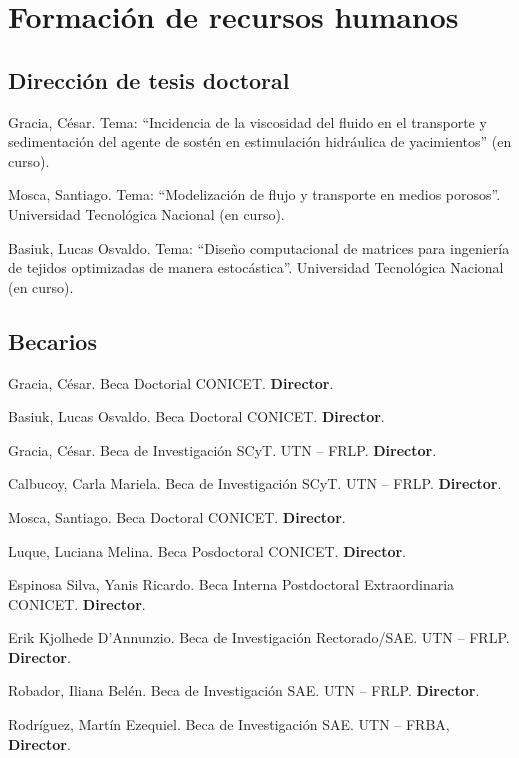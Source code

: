 \section{Formación de recursos humanos}

\subsection{Dirección de tesis doctoral}
 Gracia, César. Tema: ``Incidencia de la viscosidad del fluido en el transporte y sedimentación del agente de sostén en estimulación hidráulica de yacimientos'' (en curso).

 Mosca, Santiago. Tema: ``Modelización de flujo y transporte en medios porosos''. Universidad Tecnológica Nacional (en curso).

 Basiuk, Lucas Osvaldo. Tema: ``Diseño computacional de matrices para ingeniería de tejidos optimizadas de manera estocástica''. Universidad Tecnológica Nacional  (en curso).

\subsection{Becarios}

     Gracia, César. Beca Doctorial CONICET. \textbf{Director}.

     Basiuk, Lucas Osvaldo. Beca Doctoral CONICET. \textbf{Director}.

     Gracia, César. Beca de Investigación SCyT. UTN -- FRLP. \textbf{Director}.

     Calbucoy, Carla Mariela. Beca de Investigación SCyT. UTN -- FRLP. \textbf{Director}.

     Mosca, Santiago. Beca Doctoral CONICET. \textbf{Director}.

     Luque, Luciana Melina. Beca Posdoctoral CONICET. \textbf{Director}.

     Espinosa Silva, Yanis Ricardo. Beca Interna Postdoctoral Extraordinaria CONICET. \textbf{Director}.

     Erik Kjolhede D'Annunzio. Beca de Investigación Rectorado/SAE. UTN -- FRLP. \textbf{Director}.

     Robador, Iliana Belén. Beca de Investigación SAE. UTN -- FRLP. \textbf{Director}.

     Rodríguez, Martín Ezequiel. Beca de Investigación SAE. UTN -- FRBA, \textbf{Director}.

